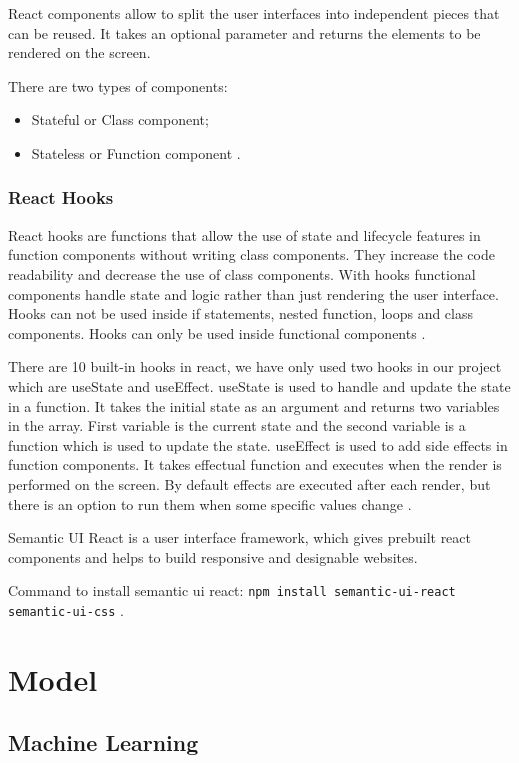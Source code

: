 React components allow to split the user interfaces into independent pieces that can be reused. It takes an optional parameter and returns the elements to be rendered on the screen.

There are two types of components:
\begin{itemize}
\item Stateful or Class component;
\item Stateless or Function component \cite{react-doc}.
\end{itemize}


\subsubsection{React Hooks}

React hooks are functions that allow the use of state and lifecycle features in function components without writing class components. They increase the code readability and decrease the use of class components. With hooks functional components handle state and logic rather than just rendering the user interface. Hooks can not be used inside if statements, nested function, loops and class components. Hooks can only be used inside functional components \cite{react-doc}.
 
There are 10 built-in hooks in react, we have only used two hooks in our project which are useState and useEffect. useState is used to handle and update the state in a function. It takes the initial state as an argument and returns two variables in the array. First variable is the current state and the second variable is a function which is used to update the state. useEffect is used to add side effects in function components. It takes effectual function and executes when the render is performed on the screen. By default effects are executed after each render, but there is an option to run them when some specific values change \cite{react-doc}. 


Semantic UI React is a user interface framework, which gives prebuilt react components and helps to build responsive and designable websites.

Command to install semantic ui react: \texttt{npm install semantic-ui-react semantic-ui-css} \cite{react-tutorial}.


\section{Model}

\subsection{Machine Learning}

